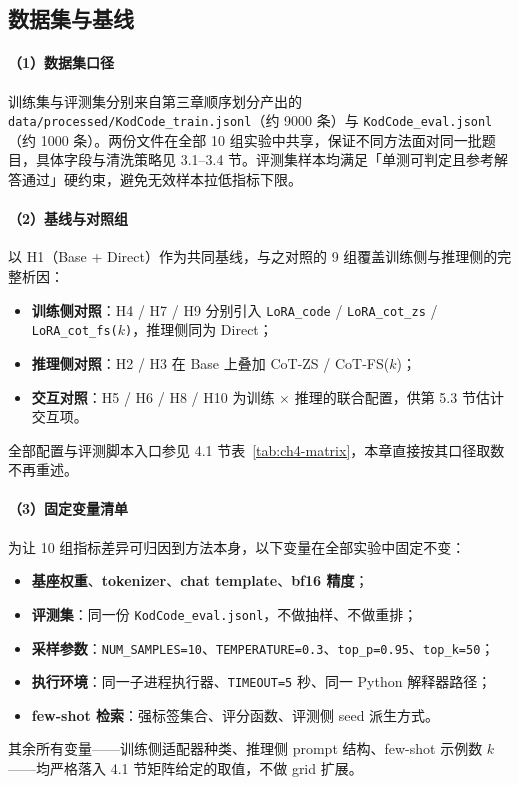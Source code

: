 \subsection{数据集与基线}

\paragraph{（1）数据集口径}
训练集与评测集分别来自第三章顺序划分产出的 \texttt{data/processed/KodCode\_train.jsonl}（约 9000 条）与 \texttt{KodCode\_eval.jsonl}（约 1000 条）。两份文件在全部 10 组实验中共享，保证不同方法面对同一批题目，具体字段与清洗策略见 3.1--3.4 节。评测集样本均满足「单测可判定且参考解答通过」硬约束，避免无效样本拉低指标下限。

\paragraph{（2）基线与对照组}
以 H1（Base + Direct）作为共同基线，与之对照的 9 组覆盖训练侧与推理侧的完整析因：
\begin{itemize}
    \item \textbf{训练侧对照}：H4 / H7 / H9 分别引入 \texttt{LoRA\_code} / \texttt{LoRA\_cot\_zs} / \texttt{LoRA\_cot\_fs($k$)}，推理侧同为 Direct；
    \item \textbf{推理侧对照}：H2 / H3 在 Base 上叠加 CoT-ZS / CoT-FS($k$)；
    \item \textbf{交互对照}：H5 / H6 / H8 / H10 为训练 $\times$ 推理的联合配置，供第 5.3 节估计交互项。
\end{itemize}
全部配置与评测脚本入口参见 4.1 节表~\ref{tab:ch4-matrix}，本章直接按其口径取数不再重述。

\paragraph{（3）固定变量清单}
为让 10 组指标差异可归因到方法本身，以下变量在全部实验中固定不变：
\begin{itemize}
    \item \textbf{基座权重}、\textbf{tokenizer}、\textbf{chat template}、\textbf{bf16 精度}；
    \item \textbf{评测集}：同一份 \texttt{KodCode\_eval.jsonl}，不做抽样、不做重排；
    \item \textbf{采样参数}：\texttt{NUM\_SAMPLES=10}、\texttt{TEMPERATURE=0.3}、\texttt{top\_p=0.95}、\texttt{top\_k=50}；
    \item \textbf{执行环境}：同一子进程执行器、\texttt{TIMEOUT=5} 秒、同一 Python 解释器路径；
    \item \textbf{few-shot 检索}：强标签集合、评分函数、评测侧 seed 派生方式。
\end{itemize}
其余所有变量——训练侧适配器种类、推理侧 prompt 结构、few-shot 示例数 $k$——均严格落入 4.1 节矩阵给定的取值，不做 grid 扩展。

